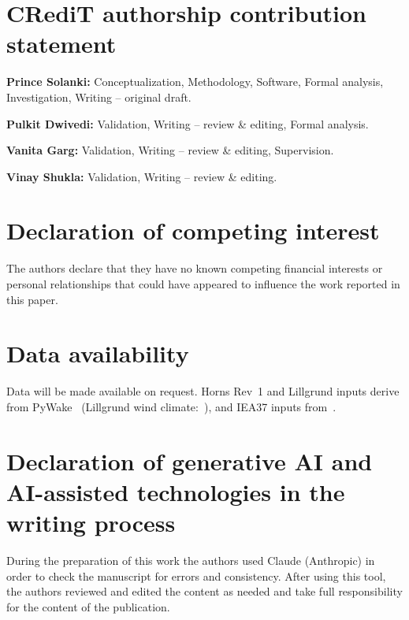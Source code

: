 
\section*{CRediT authorship contribution statement}
\noindent\textbf{Prince Solanki:} Conceptualization, Methodology, Software, Formal analysis, Investigation, Writing -- original draft.

\noindent\textbf{Pulkit Dwivedi:} Validation, Writing -- review \& editing, Formal analysis.

\noindent\textbf{Vanita Garg:} Validation, Writing -- review \& editing, Supervision.

\noindent\textbf{Vinay Shukla:} Validation, Writing -- review \& editing.

\section*{Declaration of competing interest}
The authors declare that they have no known competing financial interests or personal relationships that could have appeared to influence the work reported in this paper.

\section*{Data availability}
Data will be made available on request. Horns Rev~1 and Lillgrund inputs derive from PyWake~\cite{PyWake} (Lillgrund wind climate:~\cite{Gocmen2016}), and IEA37 inputs from~\cite{IEA37repo}.

\section*{Declaration of generative AI and AI-assisted technologies in the writing process}
During the preparation of this work the authors used Claude (Anthropic) in order to check the manuscript for errors and consistency. After using this tool, the authors reviewed and edited the content as needed and take full responsibility for the content of the publication.

